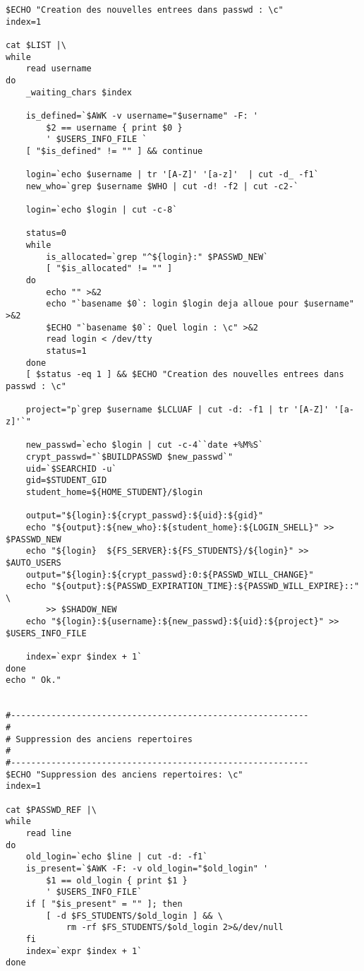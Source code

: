 \begin{verbatim}
$ECHO "Creation des nouvelles entrees dans passwd : \c"
index=1

cat $LIST |\
while
    read username
do
    _waiting_chars $index

    is_defined=`$AWK -v username="$username" -F: '
        $2 == username { print $0 }
        ' $USERS_INFO_FILE `
    [ "$is_defined" != "" ] && continue

    login=`echo $username | tr '[A-Z]' '[a-z]'  | cut -d_ -f1`
    new_who=`grep $username $WHO | cut -d! -f2 | cut -c2-`

    login=`echo $login | cut -c-8`

    status=0
    while
        is_allocated=`grep "^${login}:" $PASSWD_NEW`
        [ "$is_allocated" != "" ]
    do
        echo "" >&2
        echo "`basename $0`: login $login deja alloue pour $username" >&2
        $ECHO "`basename $0`: Quel login : \c" >&2
        read login < /dev/tty
        status=1
    done
    [ $status -eq 1 ] && $ECHO "Creation des nouvelles entrees dans passwd : \c"

    project="p`grep $username $LCLUAF | cut -d: -f1 | tr '[A-Z]' '[a-z]'`"

    new_passwd=`echo $login | cut -c-4``date +%M%S`
    crypt_passwd="`$BUILDPASSWD $new_passwd`"
    uid=`$SEARCHID -u`
    gid=$STUDENT_GID
    student_home=${HOME_STUDENT}/$login

    output="${login}:${crypt_passwd}:${uid}:${gid}"
    echo "${output}:${new_who}:${student_home}:${LOGIN_SHELL}" >> $PASSWD_NEW
    echo "${login}  ${FS_SERVER}:${FS_STUDENTS}/${login}" >> $AUTO_USERS
    output="${login}:${crypt_passwd}:0:${PASSWD_WILL_CHANGE}"
    echo "${output}:${PASSWD_EXPIRATION_TIME}:${PASSWD_WILL_EXPIRE}::" \
        >> $SHADOW_NEW
    echo "${login}:${username}:${new_passwd}:${uid}:${project}" >> $USERS_INFO_FILE

    index=`expr $index + 1`
done
echo " Ok."


#-----------------------------------------------------------
#
# Suppression des anciens repertoires
#
#-----------------------------------------------------------
$ECHO "Suppression des anciens repertoires: \c"
index=1

cat $PASSWD_REF |\
while
    read line
do
    old_login=`echo $line | cut -d: -f1`
    is_present=`$AWK -F: -v old_login="$old_login" '
        $1 == old_login { print $1 }
        ' $USERS_INFO_FILE`
    if [ "$is_present" = "" ]; then
        [ -d $FS_STUDENTS/$old_login ] && \
            rm -rf $FS_STUDENTS/$old_login 2>&/dev/null
    fi
    index=`expr $index + 1`
done


\end{verbatim}

